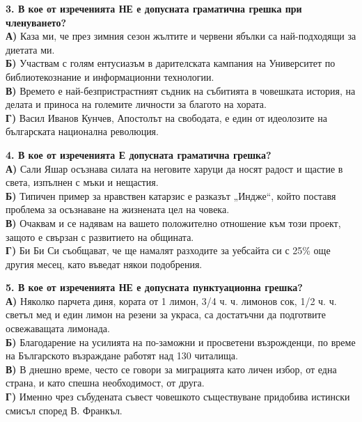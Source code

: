 \documentclass[12pt,a4paper]{article}
\begin{document}
\vspace{0.6cm}

\noindent
\textbf{3. В кое от изреченията \textbf{НЕ} е допусната граматична грешка при членуването?} \\
\textbf{А)} Каза ми, че през зимния сезон жълтите и червени ябълки са най-подходящи за диетата ми. \\
\textbf{Б)} Участвам с голям ентусиазъм в дарителската кампания на Университет по библиотекознание и информационни технологии. \\
\textbf{В)} Времето е най-безпристрастният съдник на събитията в човешката история, на делата и приноса на големите личности за благото на хората. \\
\textbf{Г)} Васил Иванов Кунчев, Апостолът на свободата, е един от идеолозите на българската национална революция.

\vspace{0.6cm}

\noindent
\textbf{4. В кое от изреченията \textbf{Е} допусната граматична грешка?} \\
\textbf{А)} Сали Яшар осъзнава силата на неговите харуци да носят радост и щастие в света, изпълнен с мъки и нещастия. \\
\textbf{Б)} Типичен пример за нравствен катарзис е разказът „Индже“, който поставя проблема за осъзнаване на жизнената цел на човека. \\
\textbf{В)} Очаквам и се надявам на вашето положително отношение към този проект, защото е свързан с развитието на общината. \\
\textbf{Г)} Би Би Си съобщават, че ще намалят разходите за уебсайта си с 25\% още другия месец, като въведат някои подобрения.

\vspace{0.6cm}

\noindent
\textbf{5. В кое от изреченията \textbf{НЕ} е допусната пунктуационна грешка?} \\
\textbf{А)} Няколко парчета диня, кората от 1 лимон, 3/4 ч. ч. лимонов сок, 1/2 ч. ч. светъл мед и един лимон на резени за украса, са достатъчни да подготвите освежаващата лимонада. \\
\textbf{Б)} Благодарение на усилията на по-заможни и просветени възрожденци, по време на Българското възраждане работят над 130 читалища. \\
\textbf{В)} В днешно време, често се говори за миграцията като личен избор, от една страна, и като спешна необходимост, от друга. \\
\textbf{Г)} Именно чрез събудената съвест човешкото съществуване придобива истински смисъл според В. Франкъл.
\end{document}
